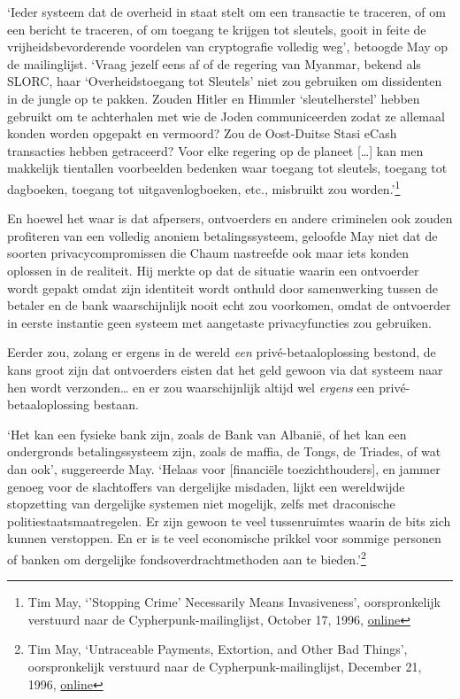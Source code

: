 \documentclass[
  a5paper,
  smalldemyvopaper,11pt,twoside,onecolumn,openright,extrafontsizes,
hidelinks]{memoir}
\begin{document}
`Ieder systeem dat de overheid in staat stelt om een transactie te
traceren, of om een bericht te traceren, of om toegang te krijgen tot
sleutels, gooit in feite de vrijheidsbevorderende voordelen van
cryptografie volledig weg', betoogde May op de mailinglijst. `Vraag
jezelf eens af of de regering van Myanmar, bekend als SLORC, haar
`Overheidstoegang tot Sleutels' niet zou gebruiken om dissidenten in de
jungle op te pakken. Zouden Hitler en Himmler `sleutelherstel' hebben
gebruikt om te achterhalen met wie de Joden communiceerden zodat ze
allemaal konden worden opgepakt en vermoord? Zou de Oost-Duitse Stasi
eCash transacties hebben getraceerd? Voor elke regering op de planeet
{[}\ldots{]} kan men makkelijk tientallen voorbeelden bedenken waar
toegang tot sleutels, toegang tot dagboeken, toegang tot
uitgavenlogboeken, etc., misbruikt zou worden.'\footnote{Tim May,
  `'Stopping Crime' Necessarily Means Invasiveness', oorspronkelijk
  verstuurd naar de Cypherpunk-mailinglijst, October 17, 1996,
  \href{https://cypherpunks.venona.com/date/1996/10/msg01269.html}{online}}

En hoewel het waar is dat afpersers, ontvoerders en andere criminelen
ook zouden profiteren van een volledig anoniem betalingssysteem,
geloofde May niet dat de soorten privacycompromissen die Chaum
nastreefde ook maar iets konden oplossen in de realiteit. Hij merkte op
dat de situatie waarin een ontvoerder wordt gepakt omdat zijn identiteit
wordt onthuld door samenwerking tussen de betaler en de bank
waarschijnlijk nooit echt zou voorkomen, omdat de ontvoerder in eerste
instantie geen systeem met aangetaste privacyfuncties zou gebruiken.

Eerder zou, zolang er ergens in de wereld \emph{een}
privé-betaaloplossing bestond, de kans groot zijn dat ontvoerders eisten
dat het geld gewoon via dat systeem naar hen wordt verzonden\ldots{} en
er zou waarschijnlijk altijd wel \emph{ergens} een privé-betaaloplossing
bestaan.

`Het kan een fysieke bank zijn, zoals de Bank van Albanië, of het kan
een ondergronds betalingssysteem zijn, zoals de maffia, de Tongs, de
Triades, of wat dan ook', suggereerde May. `Helaas voor {[}financiële
toezichthouders{]}, en jammer genoeg voor de slachtoffers van dergelijke
misdaden, lijkt een wereldwijde stopzetting van dergelijke systemen niet
mogelijk, zelfs met draconische politiestaatsmaatregelen. Er zijn gewoon
te veel tussenruimtes waarin de bits zich kunnen verstoppen. En er is te
veel economische prikkel voor sommige personen of banken om dergelijke
fondsoverdrachtmethoden aan te bieden.'\footnote{Tim May, `Untraceable
  Payments, Extortion, and Other Bad Things', oorspronkelijk verstuurd
  naar de Cypherpunk-mailinglijst, December 21, 1996,
  \href{https://cypherpunks.venona.com/date/1996/12/msg01468.html}{online}}
\end{document}
